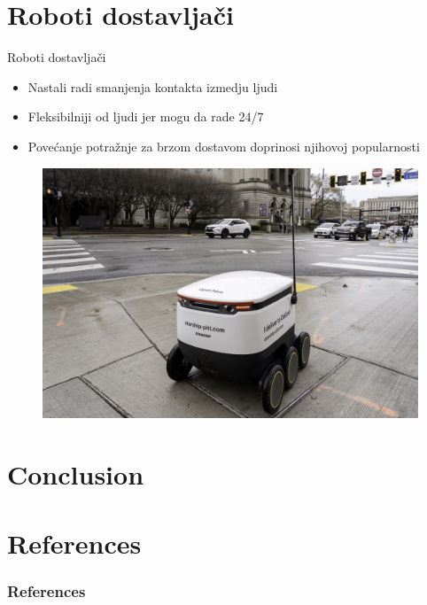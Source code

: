 \documentclass{beamer}
\begin{document}
\section{Roboti dostavljači}
\begin{frame}{Roboti dostavljači}
    \begin{itemize}
        \item Nastali radi smanjenja kontakta izmedju ljudi
        \item Fleksibilniji od ljudi jer mogu da rade 24/7
        \item Povećanje potražnje za brzom dostavom doprinosi njihovoj popularnosti
    \end{itemize}
    \begin{figure}
        \centering
        \includegraphics[scale=0.15]{DeliveryRobot.jpg}
    \end{figure}
\end{frame}

\section{Conclusion}



\section*{References}
\begin{frame}
    \frametitle{References}
    
    
\end{frame}
\end{document}
